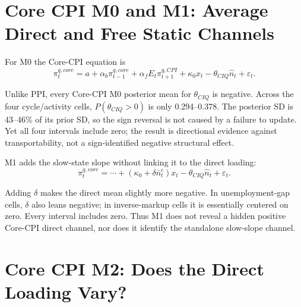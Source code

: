 \documentclass[11pt]{article}
\newcommand{\Nbar}{\bar n}
\newcommand{\Nhat}{\hat n}
\begin{document}
\section{Core CPI M0 and M1: Average Direct and Free Static Channels}

For M0 the Core-CPI equation is
\begin{equation}
\pi_t^{q,core}=a+\alpha_b\pi_{t-1}^{q,core}+\alpha_fE_t\pi_{t+1}^{q,CPI}
+\kappa_0x_t-\theta_{CIQ}\Nhat_t+\varepsilon_t.
\end{equation}

\begin{table}[H]
\centering
\caption{Core CPI M0 constant direct loading; posterior mean and 95\% interval}
\resizebox{\linewidth}{!}{}
\end{table}

Unlike PPI, every Core-CPI M0 posterior mean for $\theta_{CIQ}$ is negative. Across the four
cycle/activity cells, $P(\theta_{CIQ}>0)$ is only 0.294--0.378. The posterior SD is
43--46\% of its prior SD, so the sign reversal is not caused by a failure to update. Yet all
four intervals include zero; the result is directional evidence against transportability,
not a sign-identified negative structural effect.

M1 adds the slow-state slope without linking it to the direct loading:
\begin{equation}
\pi_t^{q,core}=\cdots+(\kappa_0+\delta\Nbar_t^c)x_t
-\theta_{CIQ}\Nhat_t+\varepsilon_t.
\end{equation}

\begin{table}[H]
\centering
\caption{Core CPI M1 free-static combined channels}
\resizebox{\linewidth}{!}{}
\end{table}

Adding $\delta$ makes the direct mean slightly more negative. In unemployment-gap cells,
$\delta$ also leans negative; in inverse-markup cells it is essentially centered on zero.
Every interval includes zero. Thus M1 does not reveal a hidden positive Core-CPI direct
channel, nor does it identify the standalone slow-slope channel.

\section{Core CPI M2: Does the Direct Loading Vary?}
\end{document}
